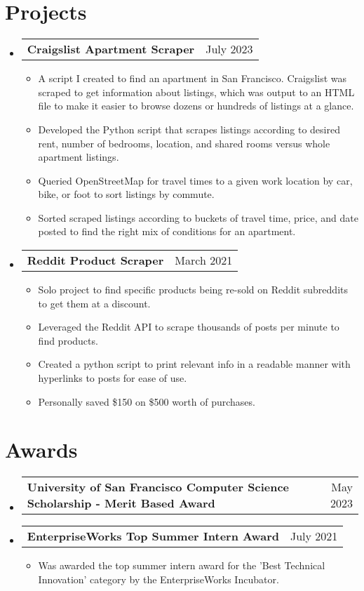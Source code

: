 \documentclass[letterpaper,11pt]{article}
\makeatletter
\newcommand{\resumeItem}[1]{
  \item\small{
    {#1 \vspace{-2pt}}
  }
}
\newcommand{\resumeProjectHeading}[2]{
    \item
    \begin{tabular*}{0.97\textwidth}{l@{\extracolsep{\fill}}r}
      \small#1 & #2 \\
    \end{tabular*}\vspace{-7pt}
}
\newcommand{\resumeSubHeadingListStart}
{\begin{itemize}[leftmargin=0.15in, label={}]}
\newcommand{\resumeSubHeadingListEnd}{\end{itemize}}
\newcommand{\resumeItemListStart}{\begin{itemize}}
\newcommand{\resumeItemListEnd}{\end{itemize}\vspace{-5pt}}
\makeatother
\begin{document}
\section{Projects}
\resumeSubHeadingListStart
\resumeProjectHeading
{\textbf{Craigslist Apartment Scraper} \emph{}}{July 2023}
\resumeItemListStart
\resumeItem{A script I created to find an apartment in San Francisco. Craigslist was scraped to get information about listings, which was output to an HTML file to make it easier to browse dozens or hundreds of listings at a glance.}
\resumeItem{Developed the Python script that scrapes listings according to desired rent, number of bedrooms, location, and shared rooms versus whole apartment listings.}
\resumeItem{Queried OpenStreetMap for travel times to a given work location by car, bike, or foot to sort listings by commute.}
\resumeItem{Sorted scraped listings according to buckets of travel time, price, and date posted to find the right mix of conditions for an apartment.}
\resumeItemListEnd
\resumeProjectHeading
{\textbf{Reddit Product Scraper} \emph{}}{March 2021}
\resumeItemListStart
\resumeItem{Solo project to find specific products being re-sold on Reddit subreddits to get them at a discount.}
\resumeItem{Leveraged the Reddit API to scrape thousands of posts per minute to find products. }
\resumeItem{Created a python script to print relevant info in a readable manner with hyperlinks to posts for ease of use. }
\resumeItem{Personally saved \$150 on \$500 worth of purchases.}
\resumeItemListEnd
\resumeSubHeadingListEnd

\section{Awards}
\resumeSubHeadingListStart
\resumeProjectHeading
{\textbf{University of San Francisco Computer Science Scholarship - Merit Based Award} \emph{}}{May 2023}
\resumeProjectHeading
{\textbf{EnterpriseWorks Top Summer Intern Award} \emph{}}{July 2021}
\resumeItemListStart
\resumeItem{Was awarded the top summer intern award for the 'Best Technical Innovation' category by the EnterpriseWorks Incubator.}
\resumeItemListEnd
\resumeSubHeadingListEnd

\end{document}
